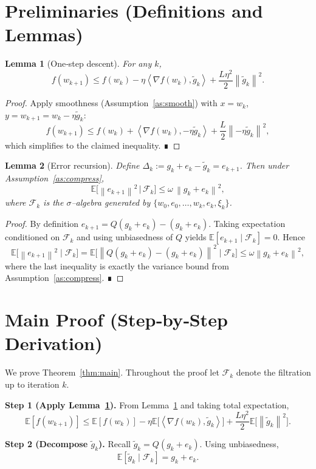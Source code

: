 \documentclass{article}
\newtheorem{lemma}{Lemma}
\newcommand{\E}{\mathbb{E}}
\newcommand{\norm}[1]{\left\lVert#1\right\rVert}
\newcommand{\ip}[2]{\left\langle#1,#2\right\rangle}
\begin{document}
\newpage
\section*{Preliminaries (Definitions and Lemmas)}
\begin{lemma}[One‑step descent]\label{lem:descent}
For any $k$,
\[
f(w_{k+1})\le f(w_k)-\eta\ip{\nabla f(w_k)}{\tilde g_k}
+\frac{L\eta^2}{2}\norm{\tilde g_k}^2 .
\]
\end{lemma}
\begin{proof}
Apply smoothness (Assumption~\ref{as:smooth}) with $x=w_k$, $y=w_{k+1}=w_k-\eta\tilde g_k$:
\[
f(w_{k+1})\le f(w_k)+\ip{\nabla f(w_k)}{-\eta\tilde g_k}
+\frac{L}{2}\norm{-\eta\tilde g_k}^2,
\]
which simplifies to the claimed inequality. ∎
\end{proof}

\begin{lemma}[Error recursion]\label{lem:error}
Define $\Delta_k:=g_k+e_k-\tilde g_k = e_{k+1}$. Then under Assumption~\ref{as:compress},
\[
\E\!\big[\norm{e_{k+1}}^2\,\big|\,\mathcal{F}_k\big]
\le \omega\,\norm{g_k+e_k}^2,
\]
where $\mathcal{F}_k$ is the $\sigma$–algebra generated by $\{w_0,e_0,\dots,w_k,e_k,\xi_k\}$.
\end{lemma}
\begin{proof}
By definition $e_{k+1}=Q(g_k+e_k)-(g_k+e_k)$. Taking expectation conditioned on $\mathcal{F}_k$ and using unbiasedness of $Q$ yields $\E[e_{k+1}\mid\mathcal{F}_k]=0$. Hence
\[
\E\!\big[\norm{e_{k+1}}^2\mid\mathcal{F}_k\big]
= \E\!\big[\norm{Q(g_k+e_k)-(g_k+e_k)}^2\mid\mathcal{F}_k\big]
\le\omega\norm{g_k+e_k}^2,
\]
where the last inequality is exactly the variance bound from Assumption~\ref{as:compress}. ∎
\end{proof}

\section*{Main Proof (Step‑by‑Step Derivation)}
We prove Theorem~\ref{thm:main}. Throughout the proof let $\mathcal{F}_k$ denote the filtration up to iteration $k$.

\noindent\textbf{Step 1 (Apply Lemma~\ref{lem:descent}).}  
From Lemma~\ref{lem:descent} and taking total expectation,
\[
\E[f(w_{k+1})]\le \E[f(w_k)]-\eta\E\!\big[\ip{\nabla f(w_k)}{\tilde g_k}\big]
+\frac{L\eta^2}{2}\E\!\big[\norm{\tilde g_k}^2\big].
\tag{2}\label{eq:step1}
\]

\noindent\textbf{Step 2 (Decompose $\tilde g_k$).}  
Recall $\tilde g_k=Q(g_k+e_k)$. Using unbiasedness,
\[
\E[\tilde g_k\mid\mathcal{F}_k]=g_k+e_k .
\tag{3}\label{eq:unbiased}
\]
\end{document}
